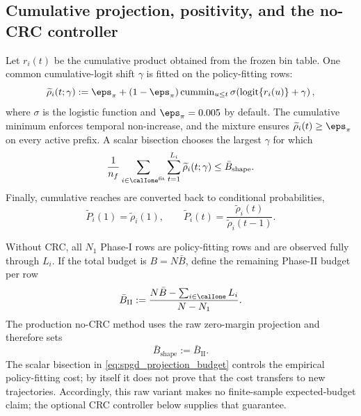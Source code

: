\subsection{Cumulative projection, positivity, and the no-CRC controller}
\label{sec:spgd_projection}

Let $r_i(t)$ be the cumulative product obtained from the frozen bin table.
One common cumulative-logit shift $\gamma$ is fitted on the policy-fitting
rows:
\begin{equation}
    \widetilde\rho_i(t;\gamma)
    :=\eps_\pi+(1-\eps_\pi)
      \operatorname{cummin}_{u\leq t}
      \sigma\!\left(\operatorname{logit}\{r_i(u)\}+\gamma\right),
    \label{eq:spgd_cumulative_projection}
\end{equation}
where $\sigma$ is the logistic function and
$\eps_\pi=0.005$ by default.  The cumulative minimum enforces temporal
non-increase, and the mixture ensures
$\widetilde\rho_i(t)\geq\eps_\pi$ on every active prefix.  A scalar bisection
chooses the largest $\gamma$ for which
\begin{equation}
    \frac{1}{n_f}\sum_{i\in\calIone^{\mathrm{fit}}}
      \sum_{t=1}^{L_i}\widetilde\rho_i(t;\gamma)
    \leq\bar B_{\mathrm{shape}}.
    \label{eq:spgd_projection_budget}
\end{equation}
Finally, cumulative reaches are converted back to conditional probabilities,
\begin{equation}
    \widetilde P_i(1)=\widetilde\rho_i(1),
    \qquad
    \widetilde P_i(t)=
      \frac{\widetilde\rho_i(t)}{\widetilde\rho_i(t-1)}.
    \label{eq:spgd_cumulative_to_conditional}
\end{equation}

Without CRC, all $N_1$ Phase-I rows are policy-fitting rows and are observed
fully through $L_i$.  If the total budget is $B=N\bar B$, define the remaining
Phase-II budget per row
\begin{equation}
    \bar B_{\mathrm{II}}
    :=\frac{N\bar B-\sum_{i\in\calIone}L_i}{N-N_1}.
\end{equation}
The production no-CRC method uses the raw zero-margin projection and therefore
sets
\begin{equation}
    \bar B_{\mathrm{shape}}:=\bar B_{\mathrm{II}}.
    \label{eq:spgd_no_crc_shape_budget}
\end{equation}
The scalar bisection in
\eqref{eq:spgd_projection_budget} controls the empirical policy-fitting cost;
by itself it does not prove that the cost transfers to new trajectories.
Accordingly, this raw variant makes no finite-sample expected-budget claim;
the optional CRC controller below supplies that guarantee.

